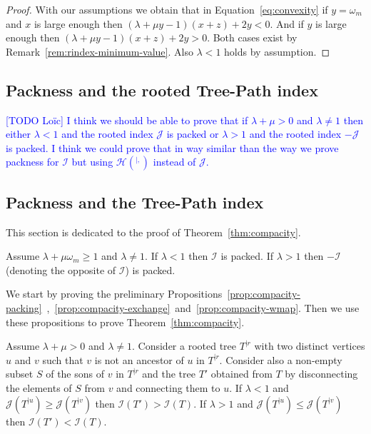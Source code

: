 \documentclass[11 pt]{modarticle}
\newcommand{\wmin}{\omega_m}
\newcommand{\rtree}[2]{{#1}^{\lvert #2}}
\newcommand{\indexsymbol}{\mathcal{I}}
\newcommand{\tindex}[1]{\indexsymbol(#1)}
\newcommand{\rindexsymbol}{\mathcal{J}}
\newcommand{\rindex}[2]{\rindexsymbol(\rtree{#2}{#1})}
\newcommand{\aindexsymbol}{\mathcal{H}}
\newcommand{\aindex}[3]{\aindexsymbol(\rtree{#3}{#1, #2})}
\newcommand{\ldtodo}[1]{\textcolor{blue}{{\footnotesize [TODO Loïc]} #1}}
\begin{document}
\begin{proof}
With our assumptions we obtain that in Equation~\eqref{eq:convexity} if $y = \wmin$ and $x$ is large enough then $(\lambda + \mu y - 1)(x+z) + 2y < 0$. And if $y$ is large enough then $(\lambda + \mu y - 1)(x+z) + 2y > 0$. Both cases exist by Remark~\ref{rem:rindex-minimum-value}. Also $\lambda < 1$ holds by assumption.
\end{proof}

\subsection{Packness and the rooted Tree-Path index}

\ldtodo{I think we should be able to prove that if $\lambda + \mu > 0$ and $\lambda \neq 1$ then either $\lambda < 1$ and the rooted index $\rindexsymbol$ is packed or $\lambda > 1$ and the rooted index $-\rindexsymbol$ is packed. I think we could prove that in way similar than the way we prove packness for $\indexsymbol$ but using $\aindex{}{}{}$ instead of $\rindexsymbol$.}












\subsection{Packness and the Tree-Path index}

This section is dedicated to the proof of Theorem~\ref{thm:compacity}.

\begin{thm}\label{thm:compacity}
 Assume $\lambda + \mu \wmin \geq 1$ and $\lambda \neq 1$. If $\lambda < 1$ then $\indexsymbol$ is packed. If $\lambda > 1$ then $-\indexsymbol$ (denoting the opposite of $\indexsymbol$) is packed.
\end{thm}


We start by proving the preliminary Propositions~\ref{prop:compacity-packing}~,~\ref{prop:compacity-exchange}~and~\ref{prop:compacity-wmap}. Then we use these propositions to prove Theorem~\ref{thm:compacity}.


\begin{prop}\label{prop:compacity-packing}
Assume $\lambda + \mu > 0$ and $\lambda \neq 1$. Consider a rooted tree $\rtree{T}{r}$ with two distinct vertices $u$ and $v$ such that $v$ is not an ancestor of $u$ in $\rtree{T}{r}$. Consider also a non-empty subset $S$ of the sons of $v$ in $\rtree{T}{r}$ and the tree $T'$ obtained from $T$ by disconnecting the elements of $S$ from $v$ and connecting them to $u$. If $\lambda < 1$ and $\rindex{u}{T} \geq \rindex{v}{T}$ then $\tindex{T'} > \tindex{T}$. If $\lambda > 1$ and $\rindex{u}{T} \leq \rindex{v}{T}$ then $\tindex{T'} < \tindex{T}$.
\end{prop}
\end{document}
